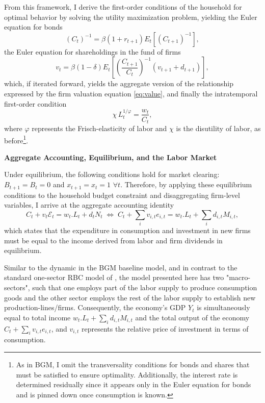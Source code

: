 \documentclass[a4paper,12pt]{article} %
\numberwithin{equation}{section} %
\numberwithin{figure}{section}
\numberwithin{table}{section}
\begin{document}
From this framework, I derive the first-order conditions of the household for optimal behavior by solving the utility maximization problem,
yielding the Euler equation for bonds 
\begin{equation}
(C_t)^{-1} = \beta (1 + r_{t+1}) E_t \left[ (C_{t+1})^{-1} \right], \label{eq:eulerbonds}
\end{equation}
the Euler equation for shareholdings in the fund of firms 
\begin{equation}
v_t = \beta (1 - \delta) E_t \left[ \left( \frac{C_{t+1}}{C_t} \right)^{-1} (v_{t+1} + d_{t+1}) \right], \label{eq:Eulershares}
\end{equation}
which, if iterated forward, yields the aggregate version of the relationship expressed by the firm valuation equation \eqref{eq:value}, and finally the intratemporal 
first-order condition 
\begin{equation}
\chi\,L_{t}^{1/\varphi}=\frac{w_t}{C_t}, \label{eq:intratemp}
\end{equation}
where $\varphi$ represents the Frisch-elasticity of labor and $\chi$ is the
disutility of labor, as before\footnote{As in BGM, I omit the transversality conditions for bonds and shares that must be satisfied to
ensure optimality. Additionally, the interest rate is determined residually since it appears only in the Euler equation for bonds and is pinned
down once consumption is known.}.

\medskip
\medskip
\noindent\textbf{Aggregate Accounting, Equilibrium, and the Labor Market}
\medskip

Under equilibrium, the following conditions hold for market clearing: $B_{t+1} = B_t=0$ and $x_{t+1}=x_t=1$ $\forall t$. Therefore, by applying these
equilibrium conditions to the household budget constraint and disaggregating firm-level variables, I arrive at the aggregate accounting identity
\begin{equation}
C_t + v_t\mathcal{E}_t= w_t.L_t + d_tN_t \;\Leftrightarrow\;C_t + \sum_iv_{i,t}e_{i,t}= w_t.L_t + \sum_id_{i,t}M_{i,t}, \label{eq:aggaccount}
\end{equation}
which states that the expenditure in consumption and investment in new firms must be equal to the income derived from labor and 
firm dividends in equilibrium.

Similar to the dynamic in the BGM baseline model, and in contrast to the standard one-sector RBC model of \textcite{campbell1994inspecting}, 
the model presented here has two "macro-sectors", such that one employs part of the labor supply to produce consumption goods and the other
sector employs the rest of the labor supply to establish new production-lines/firms. Consequently, the economy's GDP $Y_t$ is simultaneously
equal to total income $w_t.L_t + \sum_id_{i,t}M_{i,t}$ and the total output of the economy $C_t + \sum_iv_{i,t}e_{i,t}$, and $v_{i,t}$ represents 
the relative price of investment in terms of consumption.
\end{document}
